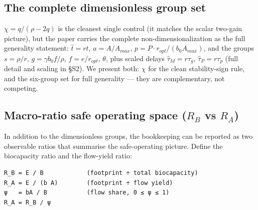 \documentclass[11pt]{article}
\begin{document}
\subsection{The complete dimensionless group set}

$\chi{} = q/(\rho{}-2q)$ is the cleanest single control (it matches the scalar two-gain picture), but the paper carries the complete non-dimensionalization as the full generality statement: $\hat{t} = rt$, $a = A/A_{max}$, $p = P\cdot{}r_{opt}/(b_{0}A_{max})$, and the groups $s = \rho{}/r$, $g = \gamma{} b_{0} f/\rho{}$, $f = e/r_{opt}$, $\theta{}$, plus scaled delays $\hat{\tau{}}_{M} = r\tau{}_{g}$, $\hat{\tau{}}_{P} = r\tau{}_{p}$ (full detail and scaling in §S2). We present both: $\chi{}$ for the clean stability-sign rule, and the six-group set for full generality — they are complementary, not competing.

\subsection{Macro-ratio safe operating space ($R_{B}$ vs $R_{A}$)}

In addition to the dimensionless groups, the bookkeeping can be reported as two observable ratios that summarise the safe-operating picture. Define the biocapacity ratio and the flow-yield ratio:

\begingroup\small\begin{verbatim}
R_B = E / B            (footprint ÷ total biocapacity)
R_A = E / (b A)        (footprint ÷ flow yield)
ψ   = bA / B           (flow share, 0 ≤ ψ ≤ 1)
R_A = R_B / ψ
\end{verbatim}\endgroup
\end{document}
